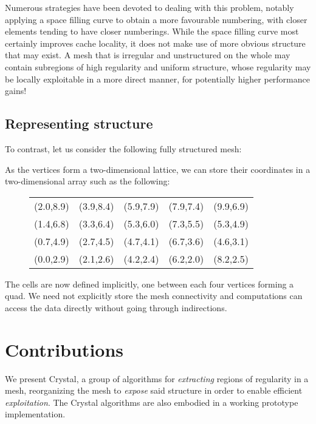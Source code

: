 Numerous strategies have been devoted to dealing with this problem, notably applying a space filling curve to obtain a more favourable numbering, with closer elements tending to have closer numberings. While the space filling curve most certainly improves cache locality, it does not make use of more obvious structure that may exist. A mesh that is irregular and unstructured on the whole may contain subregions of high regularity and uniform structure, whose regularity may be locally exploitable in a more direct manner, for potentially higher performance gains!


\subsection{Representing structure}
To contrast, let us consider the following fully structured mesh:
\begin{figure}[H]
\centering

\end{figure}

As the vertices form a two-dimensional lattice, we can store their coordinates in a two-dimensional array such as the following:
\begin{figure}[H]
\centering
\begin{tabular}{|c|c|c|c|c|}
(2.0,8.9) & (3.9,8.4) & (5.9,7.9) & (7.9,7.4) & (9.9,6.9) \\
(1.4,6.8) & (3.3,6.4) & (5.3,6.0) & (7.3,5.5) & (5.3,4.9) \\
(0.7,4.9) & (2.7,4.5) & (4.7,4.1) & (6.7,3.6) & (4.6,3.1) \\
(0.0,2.9) & (2.1,2.6) & (4.2,2.4) & (6.2,2.0) & (8.2,2.5) \\
\end{tabular}
\end{figure}

The cells are now defined implicitly, one between each four vertices forming a quad. We need not explicitly store the mesh connectivity and computations can access the data directly without going through indirections.



\section{Contributions}

We present Crystal, a group of algorithms for \emph{extracting} regions of regularity in a mesh, reorganizing the mesh to \emph{expose} said structure in order to enable efficient \emph{exploitation}. The Crystal algorithms are also embodied in a working prototype implementation.

